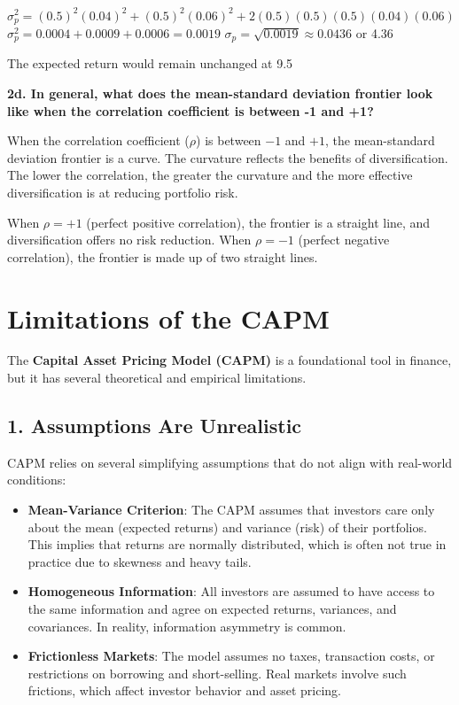 \documentclass[twoside,openany]{book}
\begin{document}
$\sigma_p^2 = (0.5)^2 (0.04)^2 + (0.5)^2 (0.06)^2 + 2(0.5)(0.5)(0.5)(0.04)(0.06)$
$\sigma_p^2 = 0.0004 + 0.0009 + 0.0006 = 0.0019$
$\sigma_p = \sqrt{0.0019} \approx 0.0436$ or 4.36%

The expected return would remain unchanged at 9.5%

\textbf{2d. In general, what does the mean-standard deviation frontier look like when the correlation coefficient is between -1 and +1?}

When the correlation coefficient (\(\rho\)) is between \(-1\) and \(+1\), the mean-standard deviation frontier is a curve. The curvature reflects the benefits of diversification. The lower the correlation, the greater the curvature and the more effective diversification is at reducing portfolio risk. 

When \(\rho = +1\) (perfect positive correlation), the frontier is a straight line, and diversification offers no risk reduction. When \(\rho = -1\) (perfect negative correlation), the frontier is made up of two straight lines.

\chapter*{Limitations of the CAPM}

The \textbf{Capital Asset Pricing Model (CAPM)} is a foundational tool in finance, but it has several theoretical and empirical limitations.

\section*{1. Assumptions Are Unrealistic}
CAPM relies on several simplifying assumptions that do not align with real-world conditions:
\begin{itemize}
    \item \textbf{Mean-Variance Criterion}: The CAPM assumes that investors care only about the mean (expected returns) and variance (risk) of their portfolios. This implies that returns are normally distributed, which is often not true in practice due to skewness and heavy tails.
    \item \textbf{Homogeneous Information}: All investors are assumed to have access to the same information and agree on expected returns, variances, and covariances. In reality, information asymmetry is common.
    \item \textbf{Frictionless Markets}: The model assumes no taxes, transaction costs, or restrictions on borrowing and short-selling. Real markets involve such frictions, which affect investor behavior and asset pricing.
\end{itemize}
\end{document}
